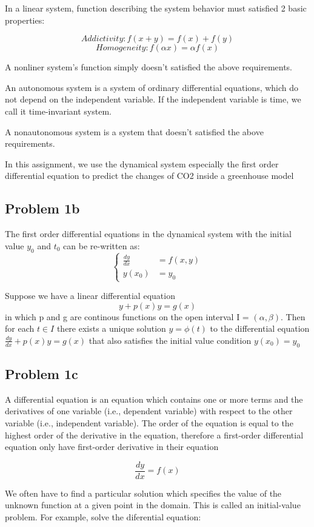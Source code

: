 In a linear system, function describing the system behavior must satisfied 2 basic properties:

\[Addictivity: f(x+y)=f(x)+f(y)\]
\[Homogeneity: f(\alpha x) = \alpha f(x)\]

A nonliner system's function simply doesn't satisfied the above requirements.

An autonomous system is a system of ordinary differential equations, which do not depend on the independent variable. If the independent variable is time, we call it time-invariant system.

A nonautonomous system is a system that doesn't satisfied the above requirements.

In this assignment, we use the dynamical system especially the first order differential equation to predict the changes of CO2 inside a greenhouse model


\subsection{Problem 1b}
The first order differential equations in the dynamical system with the initial value $y_0$ and $t_0$ can be re-written as:
\[
\left\{\begin{array}{ll}
\frac{dy}{dx} & =f(x, y) \\
y\left(x_{0}\right) & =y_{0}
\end{array}\right.
\]

Suppose we have a linear differential equation 
\[y+p(x)y=g(x)\] in which p and g are continous functions on the open interval I = $(\alpha,\beta)$. Then for each $t \in I$ there exists a unique solution $y=\phi(t)$ to the differential
equation $\frac{dy}{dx}+p(x)y=g(x)$  that also satisfies the initial value condition $y(x_0)=y_0$
\subsection{Problem 1c}

A differential equation is an equation which contains one or more terms and the derivatives of one variable (i.e., dependent variable) with respect to the other variable (i.e., independent variable). The order of the equation is equal to the highest order of the derivative in the equation, therefore a first-order differential equation only have first-order derivative in their equation

\[\frac{dy}{dx} = f(x)\]

We often have to find a particular solution which specifies the value of the unknown function at a given point in the domain. This is called an initial-value problem.
For example, solve the diferential equation:

